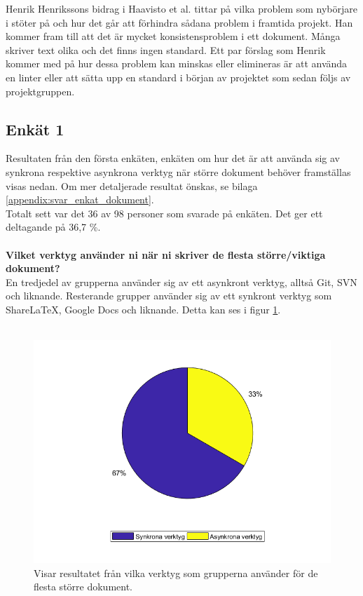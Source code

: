 Henrik Henrikssons bidrag i Haavisto et al. \cite{Haavisto954095} tittar på vilka problem som nybörjare i \latex stöter på och hur det går att förhindra sådana problem i framtida projekt. Han kommer fram till att det är mycket konsistensproblem i ett \latex dokument. Många skriver text olika och det finns ingen standard. Ett par förslag som Henrik kommer med på hur dessa problem kan minskas eller elimineras är att använda en linter eller att sätta upp en standard i början av projektet som sedan följs av projektgruppen.

\subsection{Enkät 1}
Resultaten från den första enkäten, enkäten om hur det är att använda sig av synkrona respektive asynkrona verktyg när större dokument behöver framställas visas nedan. Om mer detaljerade resultat önskas, se bilaga \ref{appendix:svar_enkat_dokument}.\\
Totalt sett var det 36 av 98 personer som svarade på enkäten. Det ger ett deltagande på 36,7 \%.\\
\\\textbf{Vilket verktyg använder ni när ni skriver de flesta större/viktiga dokument?}\\
En tredjedel av grupperna använder sig av ett asynkront verktyg, alltså Git, SVN och liknande. Resterande grupper använder sig av ett synkront verktyg som ShareLaTeX, Google Docs och liknande. Detta kan ses i figur \ref{fig:most_used_tool}.\\\\

\begin{figure}[H]	
	\includegraphics[scale=0.4]{figures/tool_used_for_documents.png}
	\centering
	\caption{Visar resultatet från vilka verktyg som grupperna använder för de flesta större dokument.}
	\label{fig:most_used_tool}
\end{figure}

